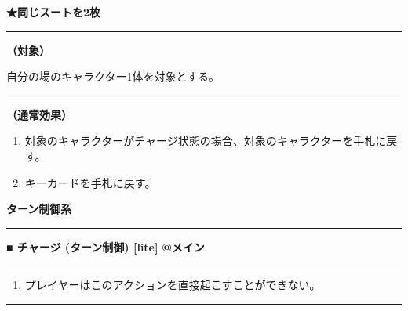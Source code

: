 \documentclass[twocolumn,a5paper,papersize,10pt]{jarticle}
\begin{document}
{\footnotesize\bf ★同じスートを2枚}

\vspace{1mm}%
\hrule height 0.1mm depth 0mm width 66.5mm %
\vspace{1mm}%
{\bf（対象）}

自分の場のキャラクター1体を対象とする。
\vspace{1mm}%
\hrule height 0.1mm depth 0mm width 66.5mm %
\vspace{1mm}%

{\bf（通常効果）}


\vspace{-1zh}%
\begin{enumerate}
\setlength{\leftskip}{-0.3cm}
\setlength{\parskip}{0pt} %

\item 対象のキャラクターがチャージ状態の場合、対象のキャラクターを手札に戻す。

\item キーカードを手札に戻す。
\vspace{-1zh}%
\end{enumerate}


\begin{tcolorbox}
{\scriptsize\bf ターン制御系}
\end{tcolorbox}
\vspace{-1zh}%
\vspace{2mm} %
\hrule height 0.5mm depth 0mm width 66.5mm %
\vspace{1mm} %
{\small\bf ■ チャージ {\scriptsize (ターン制御) [lite]}} %
\hfill 
{\footnotesize\bf @メイン }


\vspace{1mm}%
\hrule height 0.1mm depth 0mm width 66.5mm %
\vspace{1mm}%


\vspace{-1zh}%
\begin{enumerate}
\renewcommand{\labelenumi}{※}
\setlength{\leftskip}{-0.3cm}
\setlength{\itemsep}{0pt} %
\setlength{\parskip}{0pt} %

\item プレイヤーはこのアクションを直接起こすことができない。

\vspace{-3mm}%
\end{enumerate}
\vspace{1mm}%
\hrule height 0.1mm depth 0mm width 66.5mm %
\vspace{1mm}%
\end{document}
